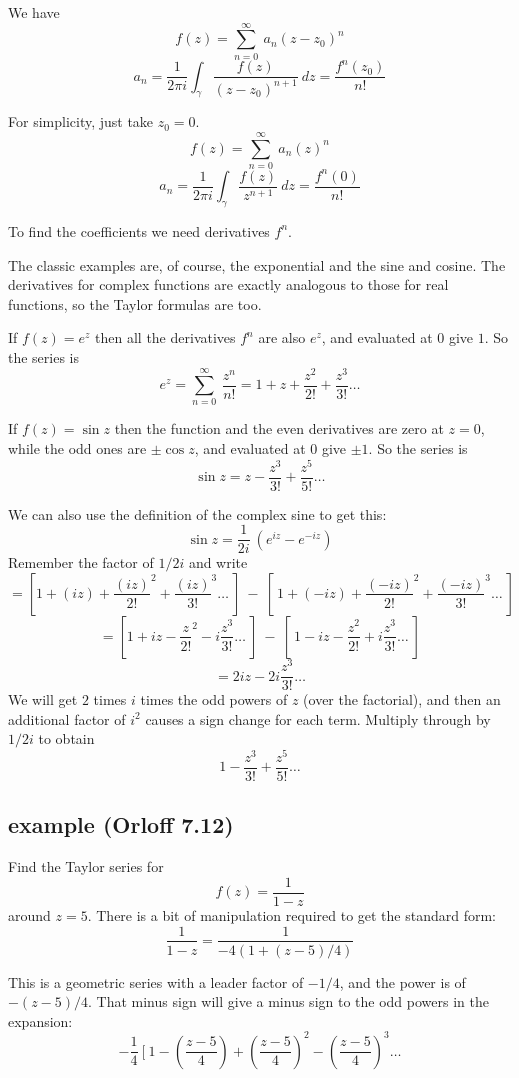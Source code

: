 \documentclass[11pt, oneside]{article}
\begin{document}
We have
\[ f(z) = \sum_{n=0}^{\infty} \ a_n(z - z_0)^n \]
\[ a_n = \frac{1}{2 \pi i} \int_{\gamma} \frac{f(z)}{(z - z_0)^{n+1}} \ dz = \frac{f^n (z_0)}{n!} \]

For simplicity, just take $z_0 = 0$.
\[ f(z) = \sum_{n=0}^{\infty} \ a_n(z)^n \]
\[ a_n = \frac{1}{2 \pi i} \int_{\gamma} \frac{f(z)}{z^{n+1}} \ dz = \frac{f^n (0)}{n!} \]

To find the coefficients we need derivatives $f^n$.

The classic examples are, of course, the exponential and the sine and cosine.  The derivatives for complex functions are exactly analogous to those for real functions, so the Taylor formulas are too.

If $f(z) = e^z$ then all the derivatives $f^n$ are also $e^z$, and evaluated at $0$ give $1$.  So the series is
\[ e^z = \sum_{n=0}^{\infty} \ \frac{z^n}{n!} = 1 + z + \frac{z^2}{2!} + \frac{z^3}{3!}  \dots \]

If $f(z) = \sin z$ then the function and the even derivatives are zero at $z = 0$, while the odd ones are $\pm \cos z$, and evaluated at $0$ give $\pm 1$.  So the series is
\[ \sin z =  z - \frac{z^3}{3!} + \frac{z^5}{5!}  \dots \]

We can also use the definition of the complex sine to get this:
\[ \sin z = \frac{1}{2i} \ (e^{iz} - e^{-iz}) \]
Remember the factor of $1/2i$ and write
\[ = [1 + (iz) + \frac{(iz)}{2!}^2 + \frac{(iz)}{3!}^3 \dots \ ] \  - \ [ \ 1 + (-iz) + \frac{(-iz)}{2!}^2 + \frac{(-iz)}{3!}^3 \dots \ ]  \]
\[ = [1 + iz - \frac{z}{2!}^2 - i \frac{z^3}{3!} \dots \ ] \  - \ [ \ 1 - iz - \frac{z^2}{2!} + i \frac{z^3}{3!} \dots \ ]  \]
\[ = 2iz -  2i \frac{z^3}{3!} \dots  \]
We will get $2$ times $i$ times the odd powers of $z$ (over the factorial), and then an additional factor of $i^2$ causes a sign change for each term.  Multiply through by $1/2i$ to obtain
\[ 1 - \frac{z^3}{3!} + \frac{z^5}{5!} \dots \]

\subsection*{example (Orloff 7.12)}

Find the Taylor series for 
\[ f(z) = \frac{1}{1 - z} \]
around $z = 5$.  There is a bit of manipulation required to get the standard form:
\[ \frac{1}{1 - z} = \frac{1}{-4(1 + (z-5)/4)} \]

This is a geometric series with a leader factor of $-1/4$, and the power is of $-(z - 5)/4$.  That minus sign will give a minus sign to the odd powers in the expansion:
\[ -\frac{1}{4} \ [ \ 1 - (\frac{z-5}{4}) + (\frac{z-5}{4})^2 - (\frac{z-5}{4})^3 \dots \]
\end{document}
